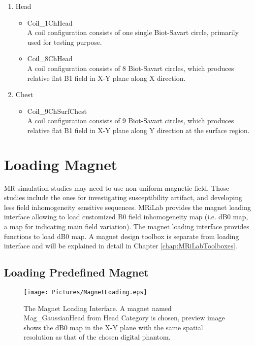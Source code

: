 \documentclass{book}%
\begin{document}
\begin{enumerate}
		\item Head
		\begin{itemize}
			\item Coil\_1ChHead \\
			A coil configuration consists of one single Biot-Savart circle, primarily used for testing purpose.
			\item Coil\_8ChHead \\
			A coil configuration consists of 8 Biot-Savart circles, which produces relative flat B1 field in X-Y plane along X direction.
		\end{itemize}
		
		\item Chest
		\begin{itemize}
			\item Coil\_9ChSurfChest \\
			A coil configuration consists of 9 Biot-Savart circles, which produces relative flat B1 field in X-Y plane along Y direction at the surface region.
		\end{itemize}
\end{enumerate}


\section{Loading Magnet}

MR simulation studies may need to use non-uniform magnetic field. Those studies include the ones for investigating susceptibility artifact, and developing less field inhomogeneity sensitive sequences. MRiLab provides the magnet loading interface allowing to load customized B0 field inhomogeneity map (i.e. dB0 map, a map for indicating main field variation). The magnet loading interface provides functions to load dB0 map. A magnet design toolbox is separate from loading interface and will be explained in detail in Chapter \ref{chap:MRiLabToolboxes}.

\subsection{Loading Predefined Magnet}

\begin{figure}[htbp]
	\centering
		\texttt{[image: Pictures/MagnetLoading.eps]}
	\caption{The Magnet Loading Interface. A magnet named Mag\_GaussianHead from Head Category is chosen, preview image shows the dB0 map in the X-Y plane with the same spatial resolution as that of the chosen digital phantom.}
	\label{fig:MagnetLoading}
\end{figure}
\end{document}
